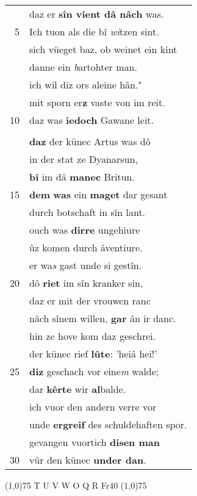 \documentclass[8pt,a4paper,notitlepage]{article}
\begin{document}
\begin{table}[ht]
\begin{minipage}[t]{0.5\linewidth}
\begin{tabular}{rl}
 & daz er \textbf{sîn vîent dâ nâch} was.\\ 
5 & Ich tuon als die bî \textit{wi}tzen sint.\\ 
 & sich vüeget baz, ob weinet ein kint\\ 
 & danne ein \textit{b}artohter man.\\ 
 & ich wil diz ors aleine hân."\\ 
 & mit sporn er\textbf{z} vaste von im reit.\\ 
10 & daz was \textbf{iedoch} Gawane leit.\\ 
 & \textbf{\textit{\begin{large}E\end{large}}r} sprach \textbf{zer vrouwen}: "ez kom \textbf{sô},\\ 
 & \textbf{daz} der künec Artus was dô\\ 
 & in der stat ze Dyanarsun,\\ 
 & \textbf{bî} im dâ \textbf{manec} Britun.\\ 
15 & \textbf{dem} \textbf{was} ein \textbf{maget} dar gesant\\ 
 & durch botschaft in sîn lant.\\ 
 & ouch was \textbf{dirre} ungehiure\\ 
 & ûz komen durch âventiure.\\ 
 & er wa\textit{s} gast unde si gestîn.\\ 
20 & dô \textbf{riet} im sîn kranker sin,\\ 
 & daz er mit der vrouwen ranc\\ 
 & nâch sînem willen, \textbf{gar} ân ir danc.\\ 
 & hin ze hove kom daz geschrei.\\ 
 & der künec rief \textbf{lûte}: 'heiâ hei!'\\ 
25 & \textbf{diz} geschach vor eine\textit{m} walde;\\ 
 & dar \textbf{kêrte} wir \textbf{al}balde.\\ 
 & ich vuor den andern verre vor\\ 
 & unde \textbf{ergreif} des schuldehaften spor.\\ 
 & gevangen vuortich \textbf{disen man}\\ 
30 & vür den künec \textbf{under dan}.\\ 
\end{tabular}
\scriptsize
\line(1,0){75} \newline
T U V W O Q R Fr40 \newline
\line(1,0){75} \newline

\end{minipage}
\end{table}
\end{document}
